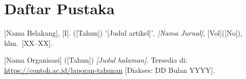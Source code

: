
\chapter*{Daftar Pustaka}

\begin{thesisbibliography}

[Nama Belakang], [I]. ([Tahun]) '[Judul artikel]',
\textit{[Nama Jurnal]}, [Vol]([No]), hlm.~[XX--XX].

[Nama Organisasi] ([Tahun]) \textit{[Judul halaman]}.
Tersedia di: \url{https://contoh.ac.id/laporan-tahunan} [Diakses: DD Bulan YYYY].

\end{thesisbibliography}
